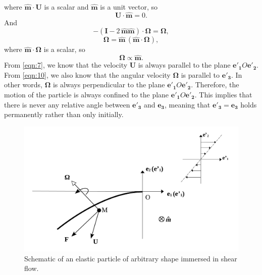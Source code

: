 \documentclass[12pt,MSc,twoside]{muthesis_2020}
\begin{document}
where $\mathbf{\hat{m}}\cdot\mathbf{U}$ is a scalar and $\mathbf{\hat{m}}$ is a unit vector, so
\begin{equation}
	\label{eqn:7}
	\mathbf{U}\cdot\mathbf{\hat{m}}=0.
\end{equation}
And
\begin{equation}
	\label{eqn:8}
	-(\mathbf{I}-2\,\mathbf{\hat{m}}\mathbf{\hat{m}})\cdot\mathbf{\Omega}=\mathbf{\Omega},
\end{equation}
\begin{equation}
	\label{eqn:9}
	\mathbf{\Omega}=\mathbf{\hat{m}}\,(\mathbf{\hat{m}}\cdot\mathbf{\Omega}),
\end{equation}
where $\mathbf{\hat{m}}\cdot\mathbf{\Omega}$ is a scalar, so
\begin{equation}
	\label{eqn:10}
	\mathbf{\Omega}\varpropto\mathbf{\hat{m}}.
\end{equation}
From \eqref{eqn:7}, we know that the velocity $\mathbf{U}$ is always parallel to the plane $\mathbf{e'_1}O\mathbf{e'_2}$. From \eqref{eqn:10}, we also know that the angular velocity $\mathbf{\Omega}$ is parallel to $\mathbf{e'_3}$. In other words, $\mathbf{\Omega}$ is always perpendicular to the plane $\mathbf{e'_1}O\mathbf{e'_2}$. Therefore, the motion of the particle is always confined to the plane $\mathbf{e'_1}O\mathbf{e'_2}$. This implies that there is never any relative angle between $\mathbf{e'_3}$ and $\mathbf{e_3}$, meaning that $\mathbf{e'_3}=\mathbf{e_3}$ holds permanently rather than only initially.
\begin{figure}[htb]
	\begin{center}
		\includegraphics[width=1\textwidth]{plot/relection_general.png}
		\caption{Schematic of an elastic particle of arbitrary shape immersed in shear flow.}
    \label{fig:4}
	\end{center}
\end{figure}
\end{document}
